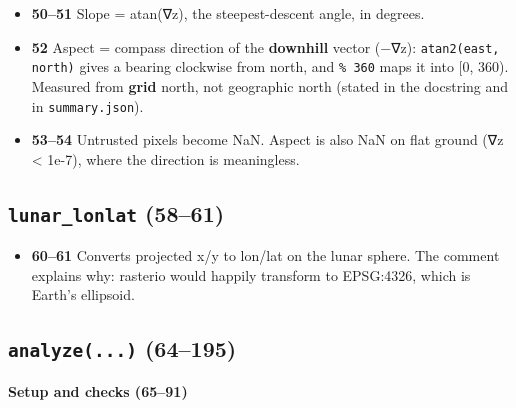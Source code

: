 \documentclass[11pt,a4paper]{article}
\providecommand{\tightlist}{\setlength{\itemsep}{0pt}\setlength{\parskip}{0pt}}
\begin{document}
\begin{itemize}
\tightlist
\item
  \textbf{50--51} Slope = atan(\textbar∇z\textbar), the steepest-descent
  angle, in degrees.
\item
  \textbf{52} Aspect = compass direction of the \textbf{downhill} vector
  (−∇z): \texttt{atan2(east, north)} gives a bearing
  clockwise from north, and \texttt{\% 360} maps it
  into {[}0, 360). Measured from \textbf{grid} north, not geographic
  north (stated in the docstring and in
  \texttt{summary.json}).
\item
  \textbf{53--54} Untrusted pixels become NaN. Aspect is also NaN on
  flat ground (\textbar∇z\textbar{} \textless{} 1e-7), where the
  direction is meaningless.
\end{itemize}

\hypertarget{lunar_lonlat-5861}{%
\subsection{\texorpdfstring{\texttt{lunar\_lonlat}
(58--61)}{lunar\_lonlat (58--61)}}\label{lunar_lonlat-5861}}

\begin{itemize}
\tightlist
\item
  \textbf{60--61} Converts projected x/y to lon/lat on the lunar sphere.
  The comment explains why: rasterio would happily transform to
  EPSG:4326, which is Earth's ellipsoid.
\end{itemize}

\hypertarget{analyze...-64195}{%
\subsection{\texorpdfstring{\texttt{analyze(...)}
(64--195)}{analyze(...) (64--195)}}\label{analyze...-64195}}

\textbf{Setup and checks (65--91)}
\end{document}
